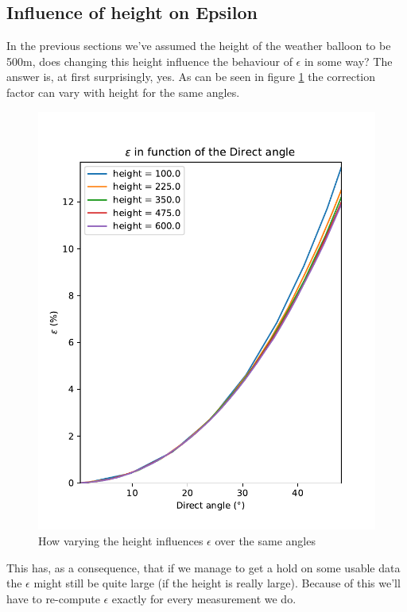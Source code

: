 \documentclass[11pt,a4paper,faculty=we,language=en,doctype=report]{cls/ugent-doc}
\begin{document}
\subsection{Influence of height on Epsilon}
In the previous sections we've assumed the height of the weather balloon to be
500m, does changing this height influence the behaviour of $\epsilon$ in some
way?  The answer is, at first surprisingly, yes. As can be seen in figure
\ref{fig:EpsWithHeight} the correction factor can vary with height for the same angles.
\begin{figure}
	\centering
	\includegraphics[height=0.4\textheight]{figures/EpsilonWithHeight.pdf}
	\caption{How varying the height influences $\epsilon$ over the same angles}
	\label{fig:EpsWithHeight}
\end{figure}
This has, as a consequence, that if we manage to get a hold on some
usable data the $\epsilon$
might still be quite large (if the height is really large).
Because of this we'll have to re-compute $\epsilon$ exactly for 
every measurement we do.
\end{document}
